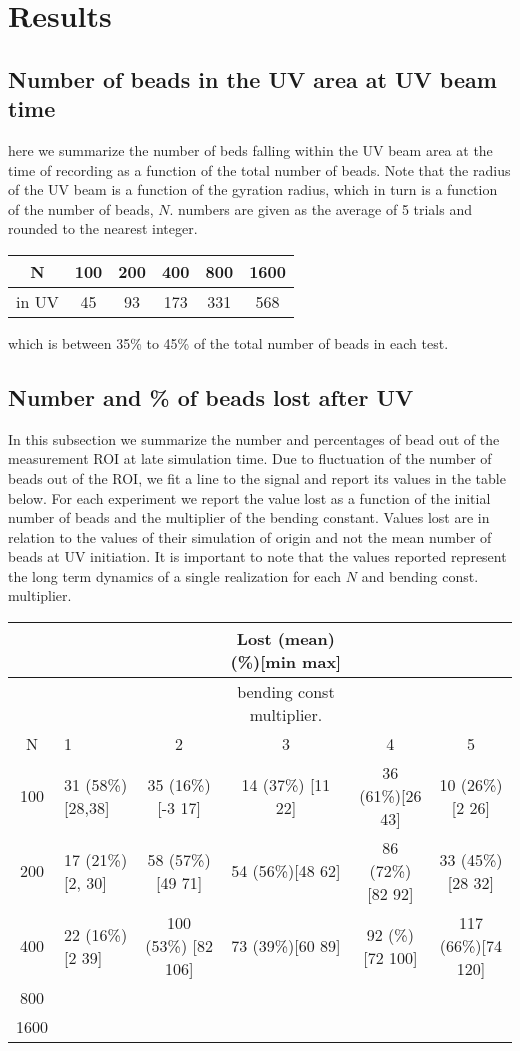 \documentclass[12pt]{report}
\begin{document}
\section{Results}
\subsection{Number of beads in the UV area at UV beam time}
here we summarize the number of beds falling within the UV beam area at the time of recording as a function of the total number of beads. Note that the radius of the UV beam is a function of the gyration radius, which in turn is a function of the number of beads, $N$. 
numbers are given as the average of 5 trials and rounded to the nearest integer. 
\begin{table}[H]
\begin{tabular}{c|c c c c c}	
	\hline
	N     & 100 & 200 & 400 & 800 & 1600\\
	\hline
	in UV & 45  & 93  & 173 & 331 & 568\\
	\hline
\end{tabular}
\end{table}
which is between 35\% to 45\%  of the total number of beads in each test.

\subsection{Number and \% of beads lost after UV}
In this subsection we summarize the number and percentages of bead out of the measurement ROI at late simulation time. Due to fluctuation of the number of beads out of the ROI, we fit a line to the signal and report its values in the table below. For each experiment we report the value lost as a function of the initial number of beads and the multiplier of the bending constant. Values lost are in relation to the values of their simulation of origin and not the mean number of beads at UV initiation. It is important to note that the values reported represent the long term dynamics of a single realization for each $N$ and bending const. multiplier.

\begin{table}[H]
	\tiny{
 \begin{tabular}{c| l c c c c}
 	   &           & & Lost (mean) (\%)[min max]& &  \\
 	 \hline
 	   &           & & bending const multiplier. & &  \\
 	   \hline 
     N 	   &            1 & 2 & 3 & 4& 5 \\   	 
 	 \hline 
 	 100 & 31 (58\%) [28,38] & 35 (16\%)[-3 17] & 14 (37\%) [11 22] & 36 (61\%)[26 43] & 10 (26\%)[2 26]\\
 	 200 & 17 (21\%) [2, 30] & 58 (57\%)[49 71]& 54 (56\%)[48 62] & 86 (72\%) [82 92] &33 (45\%)[28 32]\\
 	 400 & 22 (16\%) [2 39]  & 100 (53\%) [82 106] & 73 (39\%)[60 89]& 92 (\%)[72 100] & 117 (66\%)[74 120] \\
 	 800 &       &             & & & \\
 	 1600&       &             & & & \\
 \end{tabular}
}
\end{table}
\end{document}
